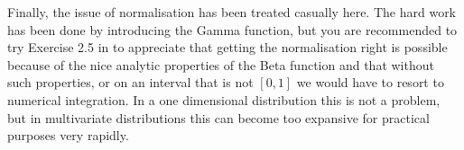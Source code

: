 Finally, the issue of normalisation has been treated casually here. The hard work has been done by introducing the Gamma function, but you are recommended to try  Exercise
2.5 in \cite{bishop2006} to appreciate that getting the normalisation right is possible because of the nice analytic properties of the Beta function and that without
such properties, or on an interval that is not $[0,1]$ we would have to resort to numerical integration. In a one dimensional distribution this is not a problem, but in
multivariate distributions this can become too expansive for practical purposes very rapidly.



  
  


  
